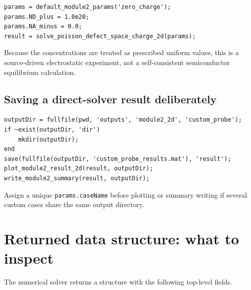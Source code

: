 \documentclass[11pt]{article}
\begin{document}
\begin{lstlisting}[style=projectmatlab]
params = default_module2_params('zero_charge');
params.ND_plus = 1.0e20;
params.NA_minus = 0.0;
result = solve_poisson_defect_space_charge_2d(params);
\end{lstlisting}
Because the concentrations are treated as prescribed uniform values, this is a source-driven electrostatic experiment, not a self-consistent semiconductor equilibrium calculation.

\subsection{Saving a direct-solver result deliberately}

\begin{lstlisting}[style=projectmatlab]
outputDir = fullfile(pwd, 'outputs', 'module2_2d', 'custom_probe');
if ~exist(outputDir, 'dir')
    mkdir(outputDir);
end
save(fullfile(outputDir, 'custom_probe_results.mat'), 'result');
plot_module2_result_2d(result, outputDir);
write_module2_summary(result, outputDir);
\end{lstlisting}
Assign a unique \texttt{params.caseName} before plotting or summary writing if several custom cases share the same output directory.

\section{Returned data structure: what to inspect}

The numerical solver returns a structure with the following top-level fields.
\end{document}
